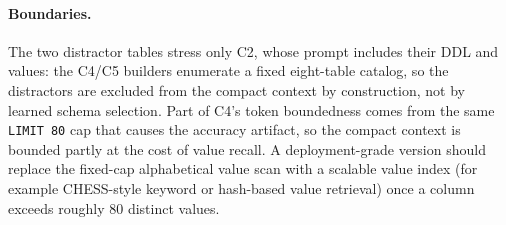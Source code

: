 \documentclass[11pt]{article}
\begin{document}
\paragraph{Boundaries.} The two distractor tables stress only C2, whose prompt includes their DDL and values: the C4/C5 builders enumerate a fixed eight-table catalog, so the distractors are excluded from the compact context by construction, not by learned schema selection. Part of C4's token boundedness comes from the same \texttt{LIMIT 80} cap that causes the accuracy artifact, so the compact context is bounded partly at the cost of value recall. A deployment-grade version should replace the fixed-cap alphabetical value scan with a scalable value index (for example CHESS-style keyword or hash-based value retrieval) once a column exceeds roughly 80 distinct values.
\end{document}
